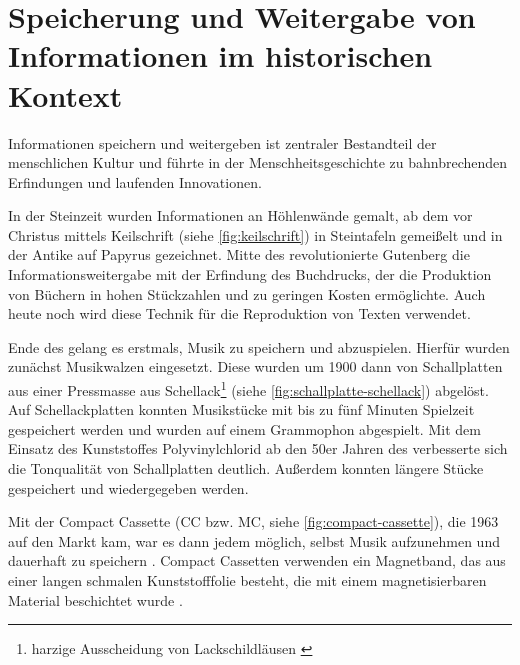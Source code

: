 \section{Speicherung und Weitergabe von Informationen im historischen Kontext}
\label{sec:einleitung}

Informationen speichern und weitergeben ist zentraler Bestandteil der
menschlichen Kultur und führte in der Menschheitsgeschichte zu bahnbrechenden
Erfindungen und laufenden Innovationen.

In der Steinzeit wurden Informationen an Höhlenwände gemalt, ab dem
 vor Christus mittels Keilschrift (siehe
\autoref{fig:keilschrift}) in Steintafeln gemeißelt und in der Antike auf
Papyrus gezeichnet. Mitte des  revolutionierte
Gutenberg die Informationsweitergabe mit der Erfindung des Buchdrucks, der die
Produktion von Büchern in hohen Stückzahlen und zu geringen Kosten ermöglichte.
Auch heute noch wird diese Technik für die Reproduktion von Texten verwendet.

Ende des  gelang es erstmals, Musik zu speichern und
abzuspielen. Hierfür wurden zunächst Musikwalzen eingesetzt. Diese wurden um
1900 dann von Schallplatten aus einer Pressmasse aus Schellack\footnote{harzige
Ausscheidung von Lackschildläusen \cite{schellack}} (siehe
\autoref{fig:schallplatte-schellack}) abgelöst. Auf Schellackplatten konnten
Musikstücke mit bis zu fünf Minuten Spielzeit gespeichert werden und wurden auf
einem Grammophon abgespielt. Mit dem Einsatz des Kunststoffes Polyvinylchlorid
ab den 50er Jahren des  verbesserte sich die
Tonqualität von Schallplatten deutlich. Außerdem konnten längere Stücke
gespeichert und wiedergegeben werden. \cite{schallplatte1}

Mit der Compact Cassette (CC bzw. MC, siehe \autoref{fig:compact-cassette}), die
1963 auf den Markt kam, war es dann jedem möglich, selbst Musik aufzunehmen und
dauerhaft zu speichern \cite{kassette}. Compact Cassetten verwenden ein
Magnetband, das aus einer langen schmalen Kunststofffolie besteht, die mit einem
magnetisierbaren Material beschichtet wurde \cite{tonband}.

